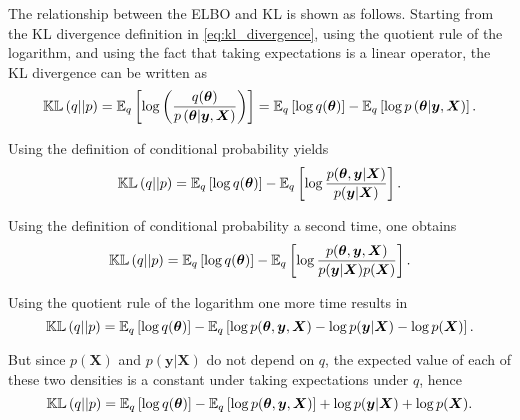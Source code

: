 The relationship between the ELBO and KL is shown as follows. Starting from the KL divergence definition in \eqref{eq:kl_divergence}, using the quotient rule of the logarithm, and using the fact that taking expectations is a linear operator, the KL divergence can be written as
\begin{equation}
    \mathbb{KL}\left( q || p \right) =
    \mathbb{E}_q \left[ \log \left( \frac{q(\boldsymbol{\theta})}{p\left( \boldsymbol{\theta} | \boldsymbol{y}, \boldsymbol{X} \right)} \right) \right] =
    \mathbb{E}_q \left[ \log  q(\boldsymbol{\theta}) \right] - \mathbb{E}_q \left[ \log {p\left( \boldsymbol{\theta} | \boldsymbol{y}, \boldsymbol{X} \right)}  \right].
\end{equation}

Using the definition of conditional probability yields
\begin{equation}
    \mathbb{KL}\left( q || p \right) =
    \mathbb{E}_q \left[ \log  q(\boldsymbol{\theta}) \right] - \mathbb{E}_q \left[ \log \frac{p(\boldsymbol{\theta}, \boldsymbol{y} | \boldsymbol{X})}{p(\boldsymbol{y} | \boldsymbol{X})}  \right].
\end{equation}

Using the definition of conditional probability a second time, one obtains
\begin{equation}
    \mathbb{KL}\left( q || p \right) =
    \mathbb{E}_q \left[ \log  q(\boldsymbol{\theta}) \right] - \mathbb{E}_q \left[ \log \frac{p(\boldsymbol{\theta}, \boldsymbol{y}, \boldsymbol{X})}{p(\boldsymbol{y} | \boldsymbol{X}) p(\boldsymbol{X})}  \right].
\end{equation}

Using the quotient rule of the logarithm one more time results in
\begin{equation}
  \mathbb{KL}\left( q || p \right) =
  \mathbb{E}_q \left[ \log  q(\boldsymbol{\theta}) \right] - \mathbb{E}_q \left[ \log p(\boldsymbol{\theta}, \boldsymbol{y}, \boldsymbol{X}) - \log p(\boldsymbol{y} | \boldsymbol{X}) - \log p(\boldsymbol{X})  \right].
\end{equation}

But since $p(\boldsymbol{X})$ and $p(\boldsymbol{y} | \boldsymbol{X})$ do not depend on $q$, the expected value of each of these two densities is a constant under taking expectations under $q$, hence
\begin{equation}
 \mathbb{KL}\left( q || p \right) =
 \mathbb{E}_q \left[ \log  q(\boldsymbol{\theta}) \right] - \mathbb{E}_q \left[ \log p(\boldsymbol{\theta}, \boldsymbol{y}, \boldsymbol{X}) \right] + \log p(\boldsymbol{y} | \boldsymbol{X}) + \log p(\boldsymbol{X}).
\end{equation}

